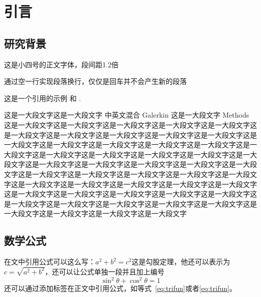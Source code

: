 \documentclass{shnuthesis}
\begin{document}
    \maketoc[pagenumtoc]


	\clearpage %


\chapter{引言}

\section{研究背景}
这是小四号的正文字体，段间距1.2倍
	
通过空一行实现段落换行，仅仅是回车并不会产生新的段落

这是一个引用的示例 \cite{Adams1975}和 \cite{Shen1994, Tadmor2012}.

这是一大段文字这是一大段文字 中英文混合 Galerkin 这是一大段文字 Methods 这是一大段文字这是一大段文字这是一大段文字这是一大段文字这是一大段文字这是一大段文字这是一大段文字这是一大段文字这是一大段文字这是一大段文字这是一大段文字这是一大段文字这是一大段文字这是一大段文字这是一大段文字这是一大段文字这是一大段文字这是一大段文字这是一大段文字这是一大段文字这是一大段文字这是一大段文字这是一大段文字这是一大段文字这是一大段文字这是一大段文字这是一大段文字这是一大段文字这是一大段文字这是一大段文字这是一大段文字这是一大段文字这是一大段文字这是一大段文字这是一大段文字这是一大段文字这是一大段文字这是一大段文字这是一大段文字这是一大段文字这是一大段文字这是一大段文字这是一大段文字这是一大段文字这是一大段文字这是一大段文字这是一大段文字这是一大段文字这是一大段文字这是一大段文字


\section{数学公式}

在文中引用公式可以这么写：$a^2+b^2=c^2$这是勾股定理，他还可以表示为$c=\sqrt{a^2+b^2}$，还可以让公式单独一段并且加上编号
\begin{equation}\label{eq:trifun}
\sin^2{\theta}+\cos^2{\theta}=1
\end{equation}
还可以通过添加标签在正文中引用公式，如等式~\eqref{eq:trifun}或者\ref{eq:trifun}。
\end{document}
